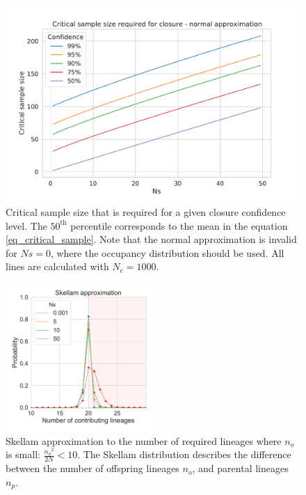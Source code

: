 \documentclass[review]{elsarticle}
\newcommand{\sgcomment}[1]{{\color{red}{SG: #1}}}
\begin{document}
\begin{figure}
  \centering
  \includegraphics[width=\textwidth]{fig/critical_normal.pdf}
  \caption{Critical sample size that is required \sgcomment{To ensure that a given proportion of simulated draws are included?} for a given closure confidence level. The
    $50^\text{th}$ percentile corresponds to the mean in the equation \eqref{eq_critical_sample}. Note that the
    normal approximation is invalid for $Ns=0$, where the occupancy distribution should be used. All
    lines are calculated with $N_e=1000$.}
  \label{fig_apx_critical_normal}
\end{figure}

\begin{figure}
  \centering
  \includegraphics[width=0.5\textwidth]{fig/skellam.pdf}
  \caption{Skellam approximation to the number of required lineages where $n_o$ is small:
  $\frac{{n_o}^2}{2N} < 10$. The Skellam distribution describes the difference between the number
  of offspring lineages $n_o$, and parental lineages $n_p$. }
  \label{fig_apx_skellam}
\end{figure}
\end{document}

